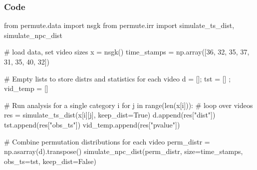 \documentclass{beamer}
\begin{document}
\begin{frame}[fragile]
\frametitle{Code}
\begin{python}
from permute.data import nsgk
from permute.irr import simulate_ts_dist, simulate_npc_dist

# load data, set video sizes
x = nsgk()
time_stamps = np.array([36, 32, 35, 37, 31, 35, 40, 32])

# Empty lists to store distrs and statistics for each video
d = []; tst = [] ; vid_temp = []

# Run analysis for a single category i
for j in range(len(x[i])):  # loop over videos
        res = simulate_ts_dist(x[i][j], keep_dist=True)
        d.append(res["dist"])
        tst.append(res["obs_ts"])
        vid_temp.append(res["pvalue"])

# Combine permutation distributions for each video
perm_distr = np.asarray(d).transpose()
simulate_npc_dist(perm_distr, size=time_stamps,
                      obs_ts=tst, keep_dist=False)
\end{python}

\end{frame}

\end{document}
